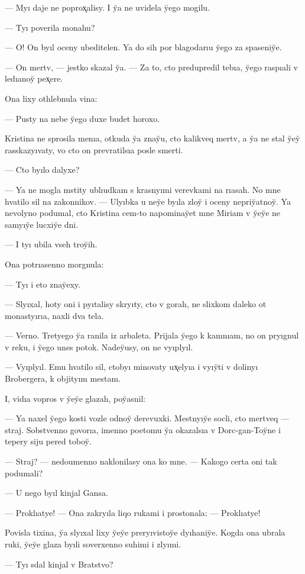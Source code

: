 \documentclass[10pt]{book}
\begin{document}
— Myı daje ne poprox̨alisy. I y̆a ne uvidela y̆ego mogilu.

— Tyı poverila monahu?

— O! On byıl oceny ubeditelen. Ya do sih por blagodarıu y̆ego za spaseniy̆e.

— On mertv, — jestko skazal y̆a. — Za to, cto predupredil tebıa, y̆ego raspıali v ledıanoy̆ pex̨ere.

Ona lixy othlebnula vina:

— Pusty na nebe y̆ego duxe budet horoxo.

Kristina ne sprosila menıa, otkuda y̆a znay̆u, cto kalikveq mertv, a y̆a ne stal y̆ey̆ rasskazyıvaty, vo cto on prevratilsıa posle smerti.

— Cto byılo dalyxe?

— Ya ne mogla mstity ublıudkam s krasnyımi verevkami na rıasah. No mne hvatilo sil na zakonnikov. — Ulyıbka u ney̆e byıla zloy̆ i oceny nepriy̆atnoy̆. Ya nevolyno podumal, cto Kristina cem-to napominay̆et mne Miriam v y̆ey̆e ne samyıy̆e lucxiy̆e dni.

— I tyı ubila vseh troy̆ih.

Ona potrıasenno morgnula:

— Tyı i eto znay̆exy.

— Slyıxal, hoty oni i pyıtalisy skryıty, cto v gorah, ne slixkom daleko ot monastyırıa, naxli dva tela.

— Verno. Tretyego y̆a ranila iz arbaleta. Prijala y̆ego k kamnıam, no on pryıgnul v reku, i y̆ego unes potok. Nadey̆usy, on ne vyıplyıl.

— Vyıplyıl. Emu hvatilo sil, ctobyı minovaty ux̨elyıa i vyıy̆ti v dolinyı Brobergera, k objityım mestam.

I, vidıa vopros v y̆ey̆e glazah, poy̆asnil:

— Ya naxel y̆ego kosti vozle odnoy̆ derevuxki. Mestnyıy̆e socli, cto mertveq — straj. Sobstvenno govorıa, imenno poetomu y̆a okazalsıa v Dorc-gan-Toy̆ne i tepery siju pered toboy̆.

— Straj? — nedoumenno naklonilasy ona ko mne. — Kakogo certa oni tak podumali?

— U nego byıl kinjal Gansa.

— Proklıatye! — Ona zakryıla liqo rukami i prostonala: — Proklıatye!

Povisla tixina, y̆a slyıxal lixy y̆ey̆e preryıvistoy̆e dyıhaniy̆e. Kogda ona ubrala ruki, y̆ey̆e glaza byıli soverxenno suhimi i zlyımi.

— Tyı sdal kinjal v Bratstvo?
\end{document}
